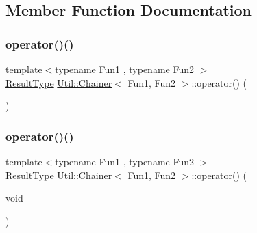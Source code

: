 \subsection{Member Function Documentation}
\mbox{\label{classUtil_1_1Chainer_a4eac17d2597562e63056bab3e1ab8046}} 
\subsubsection{\texorpdfstring{operator()()}{operator()()}\hspace{0.1cm}{\footnotesize\ttfamily [1/12]}}
{\footnotesize\ttfamily template$<$typename Fun1 , typename Fun2 $>$ \\
\mbox{\hyperlink{classUtil_1_1Chainer_a2c8d88a77b8ba93eb915dc799ddafbb9}{Result\+Type}} \mbox{\hyperlink{classUtil_1_1Chainer}{Util\+::\+Chainer}}$<$ Fun1, Fun2 $>$\+::operator() (\begin{DoxyParamCaption}{ }\end{DoxyParamCaption})\hspace{0.3cm}{\ttfamily [inline]}}

\mbox{\label{classUtil_1_1Chainer_a4eac17d2597562e63056bab3e1ab8046}} 
\subsubsection{\texorpdfstring{operator()()}{operator()()}\hspace{0.1cm}{\footnotesize\ttfamily [2/12]}}
{\footnotesize\ttfamily template$<$typename Fun1 , typename Fun2 $>$ \\
\mbox{\hyperlink{classUtil_1_1Chainer_a2c8d88a77b8ba93eb915dc799ddafbb9}{Result\+Type}} \mbox{\hyperlink{classUtil_1_1Chainer}{Util\+::\+Chainer}}$<$ Fun1, Fun2 $>$\+::operator() (\begin{DoxyParamCaption}\item[{void}]{ }\end{DoxyParamCaption})\hspace{0.3cm}{\ttfamily [inline]}}

